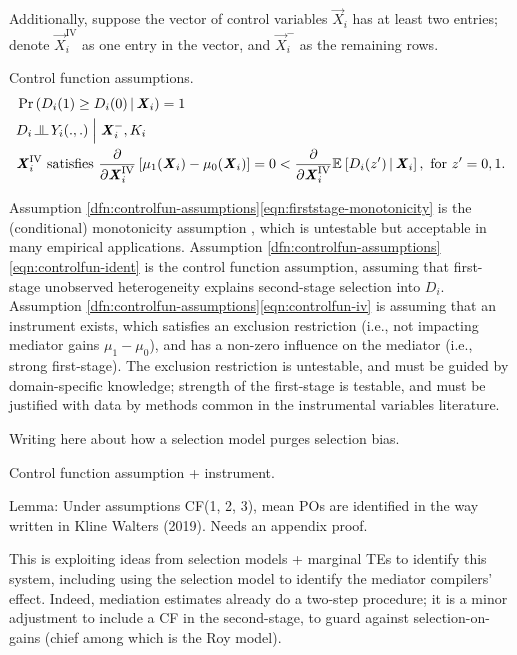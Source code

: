 Additionally, suppose the vector of control variables $\vec X_i$ has at least two entries;
denote $\vec X_i^{\text{IV}}$ as one entry in the vector, and $\vec X_i^-$ as the remaining rows.
\begin{definition}
    \label{dfn:controlfun-assumptions}
    Control function assumptions.
    \begin{align}
        \label{eqn:firststage-monotonicity}
        &\Probgiven{ D_i(1) \geq D_i(0) }{\vec X_i} = 1 \\
        \label{eqn:controlfun-ident}
        &D_i \indep Y_i(.,.) \; \Big| \; \vec X_i^-, K_i \\
        \label{eqn:controlfun-iv}
        &\vec X_i^{\text{IV}} \textnormal{ satisfies }
        \partialdiff{\vec X_i^{\text{IV}}}\left[
            \mu_1(\vec X_i) - \mu_0(\vec X_i)\right] = 0
            < \partialdiff{\vec X_i^{\text{IV}}}\Egiven{D_i(z')}{\vec X_i},
            \textnormal{ for } z' = 0, 1.
    \end{align}
\end{definition}
Assumption \ref{dfn:controlfun-assumptions}\eqref{eqn:firststage-monotonicity} is the (conditional) monotonicity assumption \citep{imbens1994identification}, which is untestable but acceptable in many empirical applications.
Assumption \ref{dfn:controlfun-assumptions}\eqref{eqn:controlfun-ident} is the control function assumption, assuming that first-stage unobserved heterogeneity explains second-stage selection into $D_i$.
Assumption \ref{dfn:controlfun-assumptions}\eqref{eqn:controlfun-iv} is assuming that an instrument exists, which satisfies an exclusion restriction (i.e., not impacting mediator gains $\mu_1-\mu_0$), and has a non-zero influence on the mediator (i.e., strong first-stage).
The exclusion restriction is untestable, and must be guided by domain-specific knowledge; strength of the first-stage is testable, and must be justified with data by methods common in the instrumental variables literature.


Writing here about how a \cite{heckman1974shadow} selection model purges selection bias.



Control function assumption + instrument.

Lemma: Under assumptions CF(1, 2, 3), mean POs are identified in the way written in Kline Walters (2019).
Needs an appendix proof.

This is exploiting ideas from selection models + marginal TEs to identify this system, including using the selection model to identify the mediator compilers’ effect.  Indeed, mediation estimates already do a two-step procedure; it is a minor adjustment to include a CF  in the second-stage, to guard against selection-on-gains (chief among which is the Roy model).

